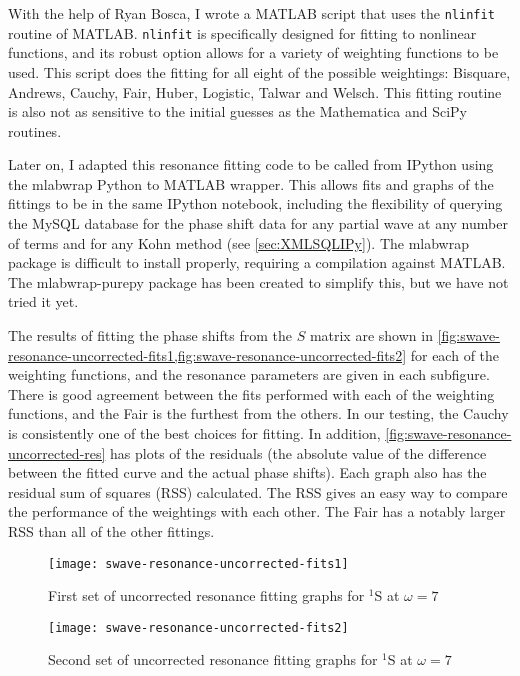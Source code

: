 \documentclass[Dissertation.tex]{subfiles}
\begin{document}
With the help of Ryan Bosca, I wrote a MATLAB\textsuperscript{\textregistered}
\cite{matlab} script that uses the \texttt{nlinfit} routine of MATLAB. 
\texttt{nlinfit} is specifically designed for fitting to nonlinear functions, 
and its robust option allows for a variety of weighting functions to be used. 
This script does the fitting for all eight of the possible weightings: 
Bisquare, Andrews, Cauchy, Fair, Huber, Logistic, Talwar and Welsch. This 
fitting routine is also not as sensitive to the initial guesses as the 
Mathematica and SciPy routines.

Later on, I adapted this resonance fitting code to be called from IPython 
\cite{ipython} using the mlabwrap \cite{mlabwrap} Python to MATLAB wrapper. 
This allows fits and graphs of the fittings to be in the same IPython 
notebook, including the flexibility of querying the MySQL database for the 
phase shift data for any partial wave at any number of terms and for
any Kohn method
(see \cref{sec:XMLSQLIPy}). The mlabwrap package is difficult to install properly, 
requiring a compilation against MATLAB. The mlabwrap-purepy package
\cite{mlabwrappurepy} has been created to simplify this, but we have not tried it 
yet.

The results of fitting the phase shifts from the $S$ matrix are shown in
\cref{fig:swave-resonance-uncorrected-fits1,fig:swave-resonance-uncorrected-fits2} 
for each of the weighting functions, and the resonance parameters are given 
in each subfigure. There is good agreement between the fits performed with 
each of the weighting functions, and the Fair is the furthest from the 
others. In our testing, the Cauchy is consistently one of the best choices 
for fitting. In addition, \cref{fig:swave-resonance-uncorrected-res} has 
plots of the residuals (the absolute value of the difference between the 
fitted curve and the actual phase shifts). Each graph also has the residual 
sum of squares (RSS) calculated. The RSS gives an easy way to compare the 
performance of the weightings with each other. The Fair has a notably larger 
RSS than all of the other fittings.

\begin{figure}
	\centering
	\texttt{[image: swave-resonance-uncorrected-fits1]}
	\caption{First set of uncorrected resonance fitting graphs for $^1$S at $\omega = 7$}
	\label{fig:swave-resonance-uncorrected-fits1}
\end{figure}

\begin{figure}
	\centering
	\texttt{[image: swave-resonance-uncorrected-fits2]}
	\caption{Second set of uncorrected resonance fitting graphs for $^1$S at $\omega = 7$}
	\label{fig:swave-resonance-uncorrected-fits2}
\end{figure}
\end{document}
